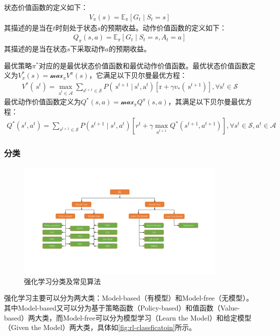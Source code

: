 状态价值函数的定义如下：
\begin{align}
    V_{\pi}(s)=\mathbb{E}_{\pi}\left[G_{t} \mid S_{t}=s\right]
\end{align}
其描述的是当在$t$时刻处于状态$s$的预期收益。动作价值函数的定义如下：
\begin{align}
    Q_{\pi}(s, a)=\mathbb{E}_{\pi}\left[G_{t} \mid S_{t}=s, A_{t}=a\right]
\end{align}
其描述的是当在状态$s$下采取动作$a$的预期收益。

最优策略$\pi^{*}$对应的是最优状态价值函数和最优动作价值函数。最优状态价值函数定义为$V_{\pi}^*(s)=\mathcal{max}_{\pi}V^{\pi}(s)$，它满足以下贝尔曼最优方程：
\begin{align}
    V^{*}\left(\mathrm{~s}^{t}\right)=\max _{\mathrm{a}^{t} \in \mathcal{A}} \sum_{\mathrm{s}^{t+1} \in \mathcal{S}} P\left(\mathrm{~s}^{t+1} \mid \mathrm{s}^{t}, \mathrm{a}^{t}\right)\left[\mathrm{r}+\gamma v_{*}\left(\mathrm{~s}^{t+1}\right)\right], \forall \mathrm{s}^{t} \in \mathcal{S}
\end{align}
最优动作价值函数定义为$Q^*(s,a)=\mathcal{max}_{\pi}Q^{\pi}(s,a)$，其满足以下贝尔曼最优方程：
\begin{align}
    Q^{*}\left(s^{t}, a^{t}\right)=\sum_{s^{t+1} \in \mathcal{S}} P\left(s^{t+1} \mid s^{t}, a^{t}\right)\left[r^{t}+\gamma \max _{a^{t+1}} Q^{*}\left(s^{t+1}, a^{t+1}\right)\right], \forall s^{t} \in \mathcal{S}, a^{t} \in \mathcal{A}
\end{align}

\subsubsection{分类}
\begin{figure}[htb]
    \includegraphics[width=0.9\textwidth]{fig/rl-classfication.pdf}
    \caption{强化学习分类及常见算法}
    \label{fig:rl-classficatoin}
\end{figure}
强化学习主要可以分为两大类：Model-based（有模型）和Model-free（无模型）。其中Model-based又可以分为基于策略函数（Policy-based）和值函数（Value-based）两大类，而Model-free可以分为模型学习（Learn the Model）和给定模型（Given the Model）两大类，具体如\autoref{fig:rl-classficatoin}所示。

